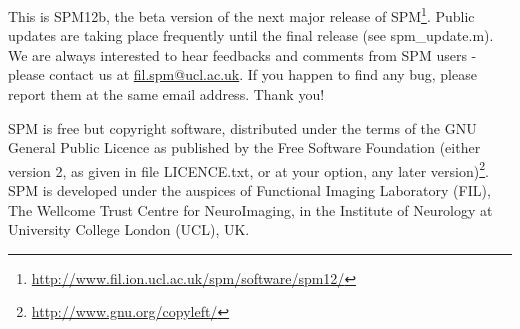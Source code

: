 \documentclass[a4paper,titlepage,openany]{article}
\begin{document}
\let\oldlabel=\label
\renewcommand{\label}[1]{
{\pdfdest name {#1} fit}
\oldlabel{#1}
}

\newlength{\centeroffset}
\setlength{\centeroffset}{-0.5\oddsidemargin}
\addtolength{\centeroffset}{0.5\evensidemargin}
\thispagestyle{empty}
\noindent\hspace*{\centeroffset}

\noindent\hspace*{\centeroffset}

\vspace{10mm}

This is SPM12b, the beta version of the next major release of SPM\footnote{\url{http://www.fil.ion.ucl.ac.uk/spm/software/spm12/}}. 
Public updates are taking place frequently until the final release (see spm\_update.m). 
We are always interested to hear feedbacks and comments from SPM users - please contact us at \href{mailto:fil.spm@ucl.ac.uk}{fil.spm@ucl.ac.uk}. 
If you happen to find any bug, please report them at the same email address. Thank you! 


SPM is free but copyright software, distributed under the terms of the GNU General Public Licence as published by the Free Software Foundation (either version 2, as given in file LICENCE.txt, or at your option, any later version)\footnote{\url{http://www.gnu.org/copyleft/}}. \\
SPM is developed under the auspices of Functional Imaging Laboratory (FIL), The Wellcome Trust Centre for NeuroImaging, in the Institute of Neurology at University College London (UCL), UK.
 
\end{document}
